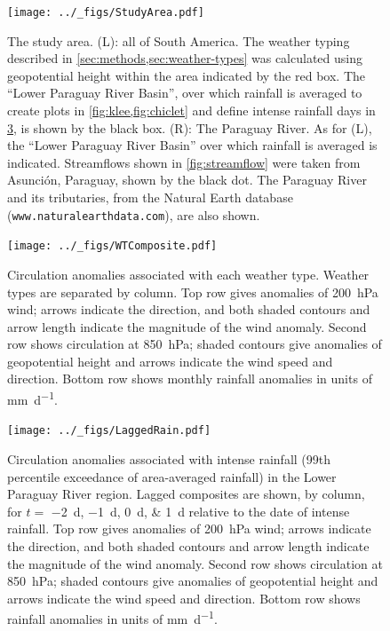 \documentclass[twocol]{ametsoc}
\begin{document}

\begin{figure}
	\noindent\texttt{[image: ../\_figs/StudyArea.pdf]}
	\caption{
		The study area.
		(L): all of South America.
		The weather typing described in \cref{sec:methods,sec:weather-types} was calculated using geopotential height within the area indicated by the red box.
		The ``Lower Paraguay River Basin'', over which rainfall is averaged to create plots in \cref{fig:klee,fig:chiclet} and define intense rainfall days in \cref{fig:lagged-rain}, is shown by the black box.
		(R): The Paraguay River.
		As for (L), the ``Lower Paraguay River Basin'' over which rainfall is averaged is indicated.
		Streamflows shown in \cref{fig:streamflow} were taken from Asunci\'on, Paraguay, shown by the black dot.
		The Paraguay River and its tributaries, from the Natural Earth database (\texttt{www.naturalearthdata.com}), are also shown.
	}
  \label{fig:study-area}
\end{figure}

\begin{figure}
	\noindent\texttt{[image: ../\_figs/WTComposite.pdf]}
	\caption{
		Circulation anomalies associated with each weather type.
    Weather types are separated by column.
		Top row gives anomalies of \SI{200}{\hecto\pascal} wind; arrows indicate the direction, and both shaded contours and arrow length indicate the magnitude of the wind anomaly.
    Second row shows circulation at \SI{850}{\hecto\pascal}; shaded contours give anomalies of geopotential height and arrows indicate the wind speed and direction.
    Bottom row shows monthly rainfall anomalies in units of \si{\milli\meter\per\day}.
	}
	\label{fig:wt-composite}
\end{figure}

\begin{figure}	\noindent\texttt{[image: ../\_figs/LaggedRain.pdf]}
	\caption{
		Circulation anomalies associated with intense rainfall (99th percentile exceedance of area-averaged rainfall) in the Lower Paraguay River region. Lagged composites are shown, by column, for $t = $ \SIlist{-2;-1;0;1}{\day} relative to the date of intense rainfall.
		Top row gives anomalies of \SI{200}{\hecto\pascal} wind; arrows indicate the direction, and both shaded contours and arrow length indicate the magnitude of the wind anomaly.
    Second row shows circulation at \SI{850}{\hecto\pascal}; shaded contours give anomalies of geopotential height and arrows indicate the wind speed and direction.
    Bottom row shows rainfall anomalies in units of \si{\milli\meter\per\day}.
	}
  \label{fig:lagged-rain}
\end{figure}
\end{document}

